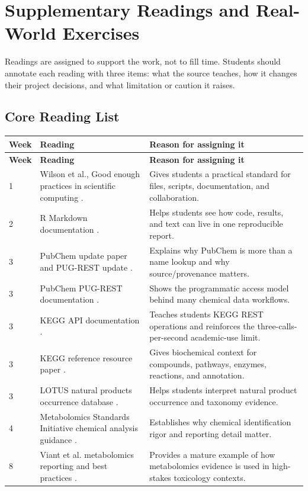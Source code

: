 \chapter{Supplementary Readings and Real-World Exercises}

Readings are assigned to support the work, not to fill time. Students should annotate each reading with three items: what the source teaches, how it changes their project decisions, and what limitation or caution it raises.

\section{Core Reading List}
\begin{longtable}{p{}p{}p{}}
\toprule
\textbf{Week} & \textbf{Reading} & \textbf{Reason for assigning it}\\
\midrule
\endfirsthead
\toprule
\textbf{Week} & \textbf{Reading} & \textbf{Reason for assigning it}\\
\midrule
\endhead
1 & Wilson et al., Good enough practices in scientific computing \cite{wilson2017}. & Gives students a practical standard for files, scripts, documentation, and collaboration.\\
2 & R Markdown documentation \cite{rmarkdown2024}. & Helps students see how code, results, and text can live in one reproducible report.\\
3 & PubChem update paper \cite{pubchem2019} and PUG-REST update \cite{pubchemPugRest2018}. & Explains why PubChem is more than a name lookup and why source/provenance matters.\\
3 & PubChem PUG-REST documentation \cite{pubchemPugRestDocs}. & Shows the programmatic access model behind many chemical data workflows.\\
3 & KEGG API documentation \cite{keggApiDocs}. & Teaches students KEGG REST operations and reinforces the three-calls-per-second academic-use limit.\\
3 & KEGG reference resource paper \cite{kegg2021}. & Gives biochemical context for compounds, pathways, enzymes, reactions, and annotation.\\
3 & LOTUS natural products occurrence database \cite{lotus2022}. & Helps students interpret natural product occurrence and taxonomy evidence.\\
4 & Metabolomics Standards Initiative chemical analysis guidance \cite{msiCawg2007}. & Establishes why chemical identification rigor and reporting detail matter.\\
8 & Viant et al. metabolomics reporting and best practices \cite{viant2019}. & Provides a mature example of how metabolomics evidence is used in high-stakes toxicology contexts.\\
\bottomrule
\end{longtable}

